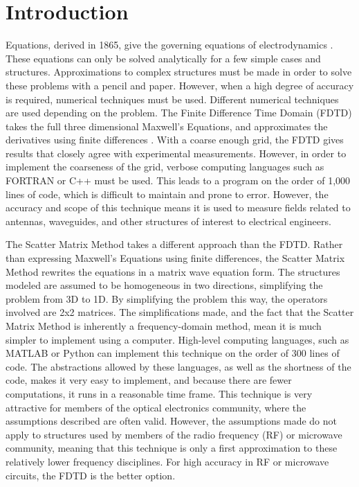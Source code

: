 \section{Introduction} \label{sec: intro}

 Equations, derived in 1865, give the governing 
equations of electrodynamics \cite{Maxwell}.  These equations can only be solved
analytically for a few simple cases and structures.  Approximations to complex 
structures must be made in order to solve these problems with a pencil and 
paper.  However, when a high degree of accuracy is required, numerical techniques 
must be used.  Different numerical techniques are used depending on the problem.
The Finite Difference Time Domain (FDTD) takes the full three dimensional 
Maxwell’s Equations, and approximates the derivatives using finite differences 
\cite{Yee}.  With a coarse enough grid, the FDTD gives results that closely 
agree with experimental measurements.  However, in order to implement the 
coarseness of the grid, verbose computing languages such as FORTRAN or C++ must
be used.  This leads to a program on the order of 1,000 lines of code, which is 
difficult to maintain and prone to error.  However, the accuracy and scope of 
this technique means it is used to measure fields related to antennas, waveguides,
and other structures of interest to electrical engineers. 

The Scatter Matrix Method takes a different approach than the FDTD.  Rather than
expressing Maxwell’s Equations using finite differences, the Scatter Matrix 
Method rewrites the equations in a matrix wave equation form.  The structures 
modeled   are assumed to be homogeneous in two directions, simplifying the 
problem from 3D to 1D.  By simplifying the problem this way, the operators 
involved are 2x2 matrices.  The simplifications made, 
and the fact that the Scatter Matrix Method is inherently a frequency-domain 
method, mean it is much simpler to implement using a computer.  High-level 
computing languages, such as MATLAB or Python can implement this technique on 
the order of 300 lines of code.  The abstractions allowed by these languages, as
well as the shortness of the code, makes it very easy to implement, and because 
there are fewer computations, it runs in a reasonable time frame.  This technique
is very attractive for members of the optical electronics community, where the 
assumptions described are often valid.  However, the assumptions made do not apply 
to structures used by members of the radio frequency (RF) or microwave community, 
meaning that this technique is only a first approximation to these relatively 
lower frequency disciplines.  For high accuracy in RF or microwave circuits, 
the FDTD is the better option. 



